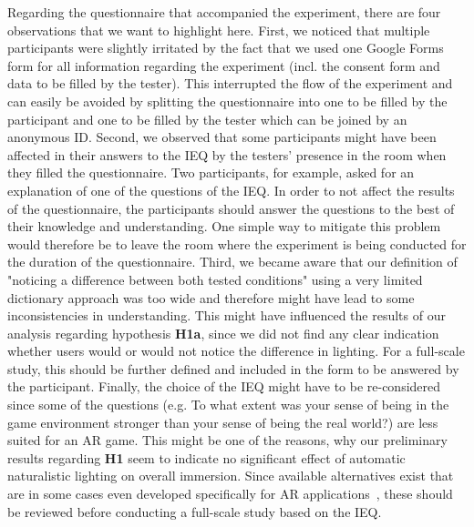 \documentclass[12pt,twoside,english]{article}
\begin{document}
Regarding the questionnaire that accompanied the experiment, there are four observations that we want to highlight here.
First, we noticed that multiple participants were slightly irritated by the fact that we used one Google Forms form for all information regarding the experiment (incl. the consent form and data to be filled by the tester).
This interrupted the flow of the experiment and can easily be avoided by splitting the questionnaire into one to be filled by the participant and one to be filled by the tester which can be joined by an anonymous ID.
Second, we observed that some participants might have been affected in their answers to the \gls{IEQ} by the testers' presence in the room when they filled the questionnaire.
Two participants, for example, asked for an explanation of one of the questions of the \gls{IEQ}.
In order to not affect the results of the questionnaire, the participants should answer the questions to the best of their knowledge and understanding.
One simple way to mitigate this problem would therefore be to leave the room where the experiment is being conducted for the duration of the questionnaire.
Third, we became aware that our definition of "noticing a difference between both tested conditions" using a very limited dictionary approach was too wide and therefore might have lead to some inconsistencies in understanding.
This might have influenced the results of our analysis regarding hypothesis \textbf{H1a}, since we did not find any clear indication whether users would or would not notice the difference in lighting.
For a full-scale study, this should be further defined and included in the form to be answered by the participant.
Finally, the choice of the \gls{IEQ} might have to be re-considered since some of the questions (e.g. To what extent was your sense of being in the game environment stronger than your sense of being the real world?) are less suited for an \gls{AR} game.
This might be one of the reasons, why our preliminary results regarding \textbf{H1} seem to indicate no significant effect of automatic naturalistic lighting on overall immersion.
Since available alternatives exist that are in some cases even developed specifically for \gls{AR} applications~\cite{georgiou_development_2017}, these should be reviewed before conducting a full-scale study based on the \gls{IEQ}.
\end{document}
